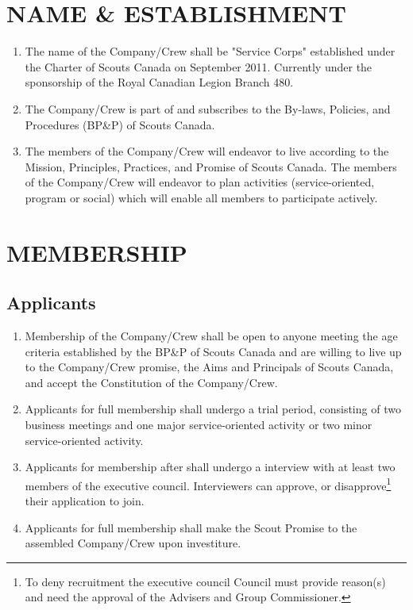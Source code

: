 \documentclass{Service_Corps_Document}
\begin{document}
\def \Title {Constitution}
\def \Company {Service Corps}
\def \versionNumber {4.0}
\stdFooter
\begin{titlepage}
	\stdTitlePage
\end{titlepage}

\tableofcontents	
		
\newpage
\section{NAME \& ESTABLISHMENT}
\begin{enumerate}
	\item The name of the Company/Crew shall be "Service Corps" established under the Charter of Scouts Canada on September 2011. Currently under the sponsorship of the Royal Canadian Legion Branch 480.
	\item The Company/Crew is part of and subscribes to the By-laws, Policies, and Procedures (BP\&P) of Scouts Canada.
	\item The members of the Company/Crew will endeavor to live according to the Mission, Principles, Practices, and Promise of Scouts Canada. The members of the Company/Crew will endeavor to plan activities (service-oriented, program or social) which will enable all members to participate actively.
\end{enumerate}	
\section{MEMBERSHIP}
\subsection{Applicants}
\begin{enumerate}
	\item Membership of the Company/Crew shall be open to anyone meeting the age criteria established by the BP\&P of Scouts Canada and are willing to live up to the Company/Crew promise, the Aims and Principals of Scouts Canada, and accept the Constitution of the Company/Crew. 
	\item Applicants for full membership shall undergo a trial period, consisting of two business meetings and one major service-oriented activity or two minor service-oriented activity.
	\item Applicants for membership after shall undergo a interview with at least two members of the executive council. Interviewers can approve, or disapprove\footnote{To deny recruitment the executive council Council must provide reason(s) and need the approval of the Advisers and Group Commissioner.} their application to join.
	\item Applicants for full membership shall make the Scout Promise to the assembled Company/Crew upon investiture. 
\end{enumerate}
\end{document}
